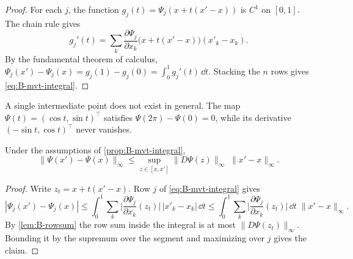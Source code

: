 \begin{proof}
For each $j$, the function $g_j(t) = \Psi_j(x + t(x' - x))$ is $C^1$ on $[0, 1]$. The chain rule gives
\begin{equation*}
g_j'(t) = \sum_{k}\frac{\partial \Psi_j}{\partial x_k}\big(x + t(x' - x)\big)(x'_k - x_k) .
\end{equation*}
By the fundamental theorem of calculus, $\Psi_j(x') - \Psi_j(x) = g_j(1) - g_j(0) = \int_0^1 g_j'(t)\,\dd t$. Stacking
the $n$ rows gives \eqref{eq:B-mvt-integral}.
\end{proof}

A single intermediate point does not exist in general. The map $\Psi(t) = (\cos t, \sin t)^\top$ satisfies
$\Psi(2\pi) - \Psi(0) = 0$, while its derivative $(-\sin t, \cos t)^\top$ never vanishes.

\begin{corollary}\label{cor:B-mvi}
Under the assumptions of \cref{prop:B-mvt-integral},
\begin{equation*}
\|\Psi(x') - \Psi(x)\|_\infty \leq \sup_{z \in [x, x']}\|D\Psi(z)\|_\infty\;\|x' - x\|_\infty .
\end{equation*}
\end{corollary}

\begin{proof}
Write $z_t = x + t(x' - x)$. Row $j$ of \eqref{eq:B-mvt-integral} gives
\begin{equation*}
|\Psi_j(x') - \Psi_j(x)| \leq \int_0^1\sum_k\Big|\frac{\partial \Psi_j}{\partial x_k}(z_t)\Big|\,|x'_k - x_k|\,\dd t
\leq \int_0^1\sum_k\Big|\frac{\partial \Psi_j}{\partial x_k}(z_t)\Big|\,\dd t\;\|x' - x\|_\infty .
\end{equation*}
By \cref{lem:B-rowsum} the row sum inside the integral is at most $\|D\Psi(z_t)\|_\infty$. Bounding it by the
supremum over the segment and maximizing over $j$ gives the claim.
\end{proof}

